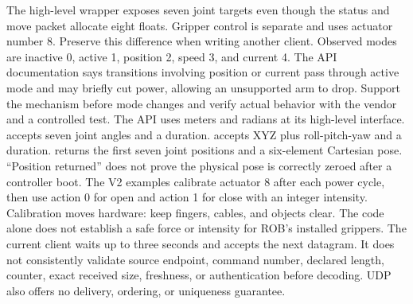 {}\markdownRendererInterblockSeparator
{}The high-level wrapper exposes seven joint targets even though the status and move packet allocate eight floats. Gripper control is separate and uses actuator number 8. Preserve this difference when writing another client.\markdownRendererParagraphSeparator
{}Observed modes are inactive 0, active 1, position 2, speed 3, and current 4. The API documentation says transitions involving position or current pass through active mode and may briefly cut power, allowing an unsupported arm to drop. Support the mechanism before mode changes and verify actual behavior with the vendor and a controlled test.\markdownRendererParagraphSeparator
{}The API uses meters and radians at its high-level interface.  accepts seven joint angles and a duration.  accepts XYZ plus roll-pitch-yaw and a duration.  returns the first seven joint positions and a six-element Cartesian pose. “Position returned” does not prove the physical pose is correctly zeroed after a controller boot.\markdownRendererInterblockSeparator
{}
\markdownRendererSectionEnd \markdownRendererSectionBegin
{}\markdownRendererInterblockSeparator
{}The V2 examples calibrate actuator 8 after each power cycle, then use action 0 for open and action 1 for close with an integer intensity. Calibration moves hardware: keep fingers, cables, and objects clear. The code alone does not establish a safe force or intensity for ROB's installed grippers.\markdownRendererInterblockSeparator
{}
\markdownRendererSectionEnd \markdownRendererSectionBegin
{}\markdownRendererInterblockSeparator
{}The current client waits up to three seconds and accepts the next datagram. It does not consistently validate source endpoint, command number, declared length, counter, exact received size, freshness, or authentication before decoding. UDP also offers no delivery, ordering, or uniqueness guarantee.\markdownRendererParagraphSeparator
